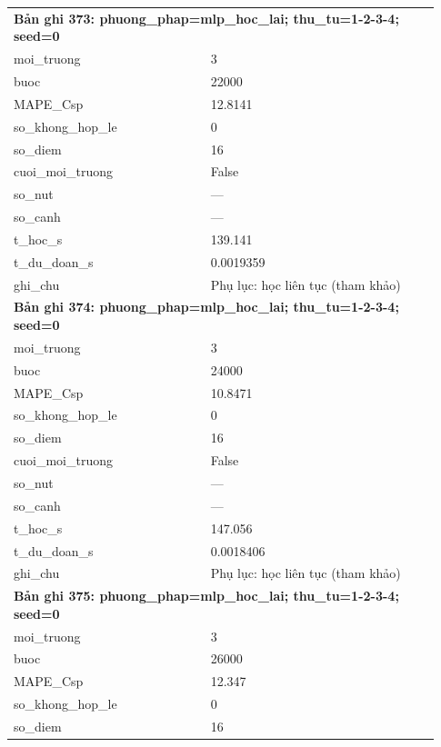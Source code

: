\begin{longtable}{p{0.43\linewidth}p{0.50\linewidth}}
\midrule
\multicolumn{2}{p{0.95\linewidth}}{\textbf{Bản ghi 373: phuong\_phap=mlp\_hoc\_lai; thu\_tu=1-2-3-4; seed=0}} \\
moi\_\allowbreak truong & 3 \\
buoc & 22000 \\
MAPE\_\allowbreak Csp & 12.8141 \\
so\_\allowbreak khong\_\allowbreak hop\_\allowbreak le & 0 \\
so\_\allowbreak diem & 16 \\
cuoi\_\allowbreak moi\_\allowbreak truong & False \\
so\_\allowbreak nut & — \\
so\_\allowbreak canh & — \\
t\_\allowbreak hoc\_\allowbreak s & 139.141 \\
t\_\allowbreak du\_\allowbreak doan\_\allowbreak s & 0.0019359 \\
ghi\_\allowbreak chu & Phụ lục: học liên tục (tham khảo) \\
\midrule
\multicolumn{2}{p{0.95\linewidth}}{\textbf{Bản ghi 374: phuong\_phap=mlp\_hoc\_lai; thu\_tu=1-2-3-4; seed=0}} \\
moi\_\allowbreak truong & 3 \\
buoc & 24000 \\
MAPE\_\allowbreak Csp & 10.8471 \\
so\_\allowbreak khong\_\allowbreak hop\_\allowbreak le & 0 \\
so\_\allowbreak diem & 16 \\
cuoi\_\allowbreak moi\_\allowbreak truong & False \\
so\_\allowbreak nut & — \\
so\_\allowbreak canh & — \\
t\_\allowbreak hoc\_\allowbreak s & 147.056 \\
t\_\allowbreak du\_\allowbreak doan\_\allowbreak s & 0.0018406 \\
ghi\_\allowbreak chu & Phụ lục: học liên tục (tham khảo) \\
\midrule
\multicolumn{2}{p{0.95\linewidth}}{\textbf{Bản ghi 375: phuong\_phap=mlp\_hoc\_lai; thu\_tu=1-2-3-4; seed=0}} \\
moi\_\allowbreak truong & 3 \\
buoc & 26000 \\
MAPE\_\allowbreak Csp & 12.347 \\
so\_\allowbreak khong\_\allowbreak hop\_\allowbreak le & 0 \\
so\_\allowbreak diem & 16 \\

\end{longtable}
